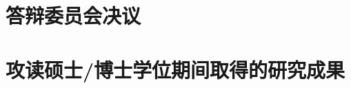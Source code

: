 \chapter{答辩委员会决议}



\chapter{攻读硕士/博士学位期间取得的研究成果}
 \begin{enumerate}[label={[\arabic*]}]
  \item 
  \item 
  \item 
  \item 
  \item 
\end{enumerate}
